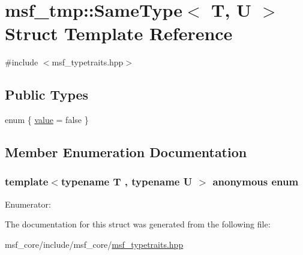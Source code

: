 \hypertarget{structmsf__tmp_1_1SameType}{\section{msf\-\_\-tmp\-:\-:Same\-Type$<$ T, U $>$ Struct Template Reference}
\label{structmsf__tmp_1_1SameType}
}


{\ttfamily \#include $<$msf\-\_\-typetraits.\-hpp$>$}

\subsection*{Public Types}
\begin{DoxyCompactItemize}
\item 
enum \{ \hyperlink{structmsf__tmp_1_1SameType_af6f7567ca10c06b552e2714d37d3d868a649157a456919a298d1703c45117e197}{value} =  false
 \}
\end{DoxyCompactItemize}


\subsection{Member Enumeration Documentation}
\hypertarget{structmsf__tmp_1_1SameType_af6f7567ca10c06b552e2714d37d3d868}{\subsubsection[{anonymous enum}]{\setlength{\rightskip}{0pt plus 5cm}template$<$typename T , typename U $>$ anonymous enum}}\label{structmsf__tmp_1_1SameType_af6f7567ca10c06b552e2714d37d3d868}
\begin{Desc}
\item[Enumerator\-: ]\par
\begin{description}
\item[{\em 
\hypertarget{structmsf__tmp_1_1SameType_af6f7567ca10c06b552e2714d37d3d868a649157a456919a298d1703c45117e197}{value}\label{structmsf__tmp_1_1SameType_af6f7567ca10c06b552e2714d37d3d868a649157a456919a298d1703c45117e197}
}]\end{description}
\end{Desc}



The documentation for this struct was generated from the following file\-:\begin{DoxyCompactItemize}
\item 
msf\-\_\-core/include/msf\-\_\-core/\hyperlink{msf__typetraits_8hpp}{msf\-\_\-typetraits.\-hpp}\end{DoxyCompactItemize}
